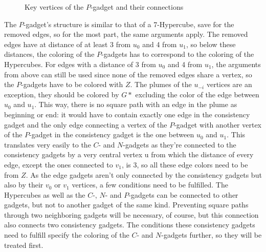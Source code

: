 \documentclass[12pt,a4paper]{article}
\begin{document}
\newline
\begin{figure}

\caption{Key vertices of the $P$-gadget and their connections}
\end{figure}
\newline
The $P$-gadget's structure is similar to that of a 7-Hypercube, save for the removed edges, so for the most part, the same arguments apply. The removed edges have at distance of at least 3 from $u_0$ and 4 from $u_1$, so below these distances, the coloring of the $P$-gadgets has to correspond to the coloring of the Hypercubes. For edges with a distance of 3 from $u_0$ and 4 from $u_1$, the arguments from above can still be used since none of the removed edges share a vertex, so the $P$-gadgets have to be colored with $Z$. The plumes of the $u_{-i}$ vertices are an exception, they should be colored by $G*$ excluding the color of the edge between $u_0$ and $u_1$. This way, there is no square path with an edge in the plume as beginning or end: it would have to contain exactly one edge in the consistency gadget and the only edge connecting a vertex of the $P$-gadget with another vertex of the $P$-gadget in the consistency gadget is the one between $u_0$ and $u_1$. 
\newline
This translates very easily to the $C$- and $N$-gadgets as they're connected to the consistency gadgets by a very central vertex u from which the distance of every edge, except the ones connected to $v_1$, is 3, so all these edge colors need to be from $Z$.	
\newline
As the edge gadgets aren't only connected by the consistency gadgets but also by their $v_0$ or $v_1$ vertices, a few conditions need to be fulfilled. The Hypercubes as well as the $C$-, $N$- and $P$-gadgets can be connected to other gadgets, but not to another gadget of the same kind. Preventing square paths through two neighboring gadgets will be necessary, of course, but this connection also connects two consistency gadgets. The conditions these consistency gadgets need to fulfill specify the coloring of the $C$- and $N$-gadgets further, so they will be treated first.
\newline
\end{document}
